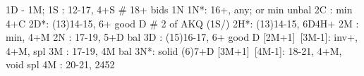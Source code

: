1D - 1M;
1S : 12-17, 4+S  # 18+ bids 1N
1N*: 16+, any; or min unbal
2C : min 4+C
2D*: (13)14-15, 6+ good D  # 2 of AKQ
(1S/) 2H*: (13)14-15, 6D4H+ 
2M : min, 4+M
2N : 17-19, 5+D bal
3D : (15)16-17, 6+ good D 
[2M+1]~[3M-1]: inv+, 4+M, spl
3M : 17-19, 4M bal
3N*: solid (6)7+D
[3M+1]~[4M-1]: 18-21, 4+M, void spl
4M : 20-21, 2452
